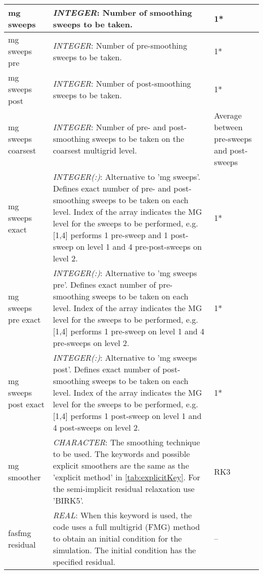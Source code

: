 \documentclass[a4paper,10pt]{report}
\begin{document}
\begin{longtable}{|p{4cm}|p{10cm}|p{2.2cm}|}
mg sweeps    & \textit{INTEGER}: Number of smoothing sweeps to be taken. & 1* \\ \hline

mg sweeps pre    & \textit{INTEGER}: Number of pre-smoothing sweeps to be taken. & 1* \\ \hline

mg sweeps post    & \textit{INTEGER}: Number of post-smoothing sweeps to be taken. & 1* \\ \hline

mg sweeps coarsest   & \textit{INTEGER}: Number of pre- and post-smoothing sweeps to be taken on the coarsest multigrid level. & Average between pre-sweeps and post-sweeps \\ \hline

mg sweeps exact & \textit{INTEGER(:)}: Alternative to 'mg sweeps'. Defines exact number of pre- and post- smoothing sweeps to be taken on each level. Index of the array indicates the MG level for the sweeps to be performed, e.g. [1,4] performs 1 pre-sweep and 1 post-sweep on level 1 and 4 pre-\/post-sweeps on level 2. & 1* \\ \hline

mg sweeps pre exact & \textit{INTEGER(:)}: Alternative to 'mg sweeps pre'. Defines exact number of pre-smoothing sweeps to be taken on each level. Index of the array indicates the MG level for the sweeps to be performed, e.g. [1,4] performs 1 pre-sweep on level 1 and 4 pre-sweeps on level 2. & 1* \\ \hline

mg sweeps post exact & \textit{INTEGER(:)}: Alternative to 'mg sweeps post'. Defines exact number of post-smoothing sweeps to be taken on each level. Index of the array indicates the MG level for the sweeps to be performed, e.g. [1,4] performs 1 post-sweep on level 1 and 4 post-sweeps on level 2. & 1* \\ \hline

mg smoother     & \textit{CHARACTER}: The smoothing technique to be used. The keywords and possible explicit smoothers are the same as the 'explicit method' in \ref{tab:explicitKey}. For the semi-implicit residual relaxation use 'BIRK5'. & RK3 \\ \hline


fasfmg residual & \textit{REAL}: When this keyword is used, the code uses a full multigrid (FMG) method to obtain an initial condition for the simulation.
The initial condition has the specified residual.	& --	\\ \hline


\end{longtable}
\end{document}
